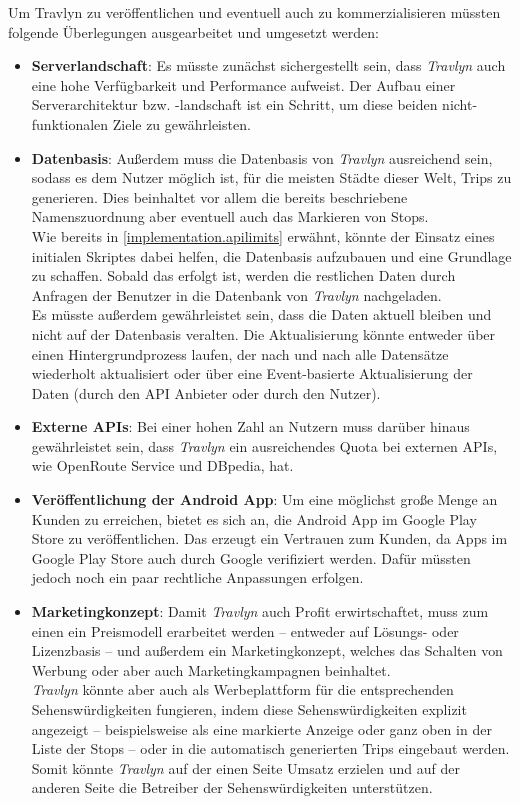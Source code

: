 		Um Travlyn zu veröffentlichen und eventuell auch zu kommerzialisieren müssten folgende Überlegungen ausgearbeitet und umgesetzt werden:
		
		\begin{itemize}
			\item \textbf{Serverlandschaft}: 
				Es müsste zunächst sichergestellt sein, dass \textit{Travlyn} auch eine hohe Verfügbarkeit und Performance aufweist. Der Aufbau einer Serverarchitektur bzw. -landschaft ist ein Schritt, um diese beiden nicht-funktionalen Ziele zu gewährleisten. 
			\item \textbf{Datenbasis}: 
				Außerdem muss die Datenbasis von \textit{Travlyn} ausreichend sein, sodass es dem Nutzer möglich ist, für die meisten Städte dieser Welt, Trips zu generieren. Dies beinhaltet vor allem die bereits beschriebene Namenszuordnung aber eventuell auch das Markieren von Stops. \\
				Wie bereits in \autoref{implementation.apilimits} erwähnt, könnte der Einsatz eines initialen Skriptes dabei helfen, die Datenbasis aufzubauen und eine Grundlage zu schaffen. Sobald das erfolgt ist, werden die restlichen Daten durch Anfragen der Benutzer in die Datenbank von \textit{Travlyn} nachgeladen. \\
				Es müsste außerdem gewährleistet sein, dass die Daten aktuell bleiben und nicht auf der Datenbasis veralten. Die Aktualisierung könnte entweder über einen Hintergrundprozess laufen, der nach und nach alle Datensätze wiederholt aktualisiert oder über eine Event-basierte Aktualisierung der Daten (durch den \acs{API} Anbieter oder durch den Nutzer). 
			\item \textbf{Externe \acs{API}s}: 
				Bei einer hohen Zahl an Nutzern muss darüber hinaus gewährleistet sein, dass \textit{Travlyn} ein ausreichendes Quota bei externen \acs{API}s, wie OpenRoute Service und DBpedia, hat. 
			\item \textbf{Veröffentlichung der Android App}: 
				Um eine möglichst große Menge an Kunden zu erreichen, bietet es sich an, die Android App im Google Play Store zu veröffentlichen. Das erzeugt ein Vertrauen zum Kunden, da Apps im Google Play Store auch durch Google verifiziert werden. Dafür müssten jedoch noch ein paar rechtliche Anpassungen erfolgen. 
			\item \textbf{Marketingkonzept}: 
				Damit \textit{Travlyn} auch Profit erwirtschaftet, muss zum einen ein Preismodell erarbeitet werden -- entweder auf Lösungs- oder Lizenzbasis -- und außerdem ein Marketingkonzept, welches das Schalten von Werbung oder aber auch Marketingkampagnen beinhaltet.\\
				\textit{Travlyn} könnte aber auch als Werbeplattform für die entsprechenden Sehenswürdigkeiten fungieren, indem diese Sehenswürdigkeiten explizit angezeigt -- beispielsweise als eine markierte Anzeige oder ganz oben in der Liste der Stops -- oder in die automatisch generierten Trips eingebaut werden. Somit könnte \textit{Travlyn} auf der einen Seite Umsatz erzielen und auf der anderen Seite die Betreiber der Sehenswürdigkeiten unterstützen. 
		\end{itemize}
	
		
	